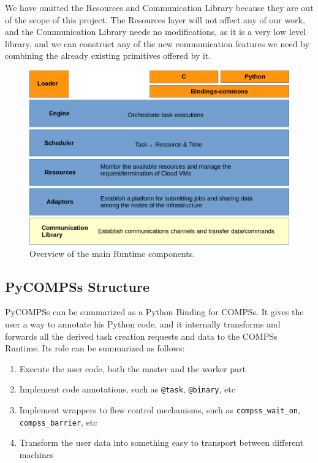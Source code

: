We have omitted the Resources and Communication Library because they are out of the scope of this project. The Resources layer will not affect any of our work, and the Communication Library needs no modifications, as it is a very low level library, and we can construct any of the new communication features we need by combining the already existing primitives offered by it.


\begin{figure}
\centering
\includegraphics[scale = 0.45]{figures/runtime_modules.png}
\caption{Overview of the main Runtime components.}
\label{fig:runtime_modules}
\end{figure}

\subsection{PyCOMPSs Structure}
\label{subsec:pycompss_structure}
PyCOMPSs can be summarized as a Python Binding for COMPSs. It gives the user a way to annotate his Python code, and it internally transforms and forwards all the derived task creation requests and data to the COMPSs Runtime. Its role can be summarized as follows:
\begin{enumerate}
\item Execute the user code, both the master and the worker part
\item Implement code annotations, such as \verb|@task|, \verb|@binary|, etc
\item Implement wrappers to flow control mechanisms, such as \verb|compss_wait_on|, \verb|compss_barrier|, etc
\item Transform the user data into something easy to transport between different machines
\end{enumerate}

